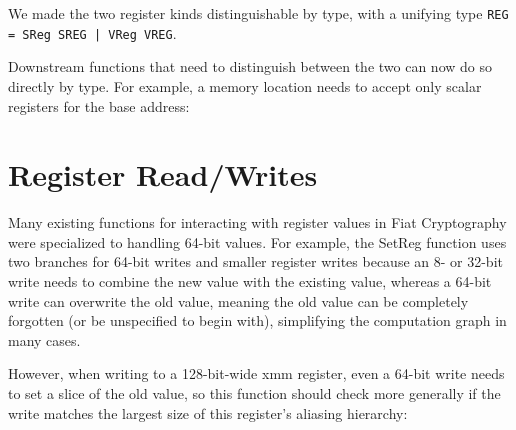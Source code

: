 We made the two register kinds distinguishable by type, with a unifying type \texttt{REG = SReg SREG | VReg VREG}.


Downstream functions that need to distinguish between the two can now do so directly by type.
For example, a memory location needs to accept only scalar registers for the base address:



\section{Register Read/Writes}
\label{sec:reg-rw}

Many existing functions for interacting with register values in Fiat Cryptography were specialized to handling 64-bit values.
For example, the SetReg function uses two branches for 64-bit writes and smaller register writes because an 8- or 32-bit write needs to combine the new value with the existing value, whereas a 64-bit write can overwrite the old value, meaning the old value can be completely forgotten (or be unspecified to begin with), simplifying the computation graph in many cases.


However, when writing to a 128-bit-wide xmm register, even a 64-bit write needs to set a slice of the old value, so this function should check more generally if the write matches the largest size of this register's aliasing hierarchy:


